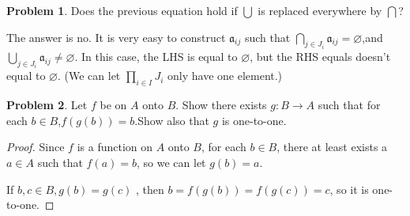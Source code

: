 \documentclass[a4paper,11pt]{article}%
\theoremstyle{remark}
\theoremstyle{definition}
\newtheorem{problem}{Problem}[subsection]
\begin{document}
\begin{problem}
    Does the previous equation hold if $\bigcup$ is replaced everywhere by $\bigcap$?

    The answer is no. It is very easy to construct $\mathfrak{a}_{ij}$ such that 
    $\bigcap_{j\in J_i}\mathfrak{a}_{ij}=\varnothing$,and $\bigcup_{j\in J_i}\mathfrak{a}_{ij}\neq\varnothing$.
    In this case, the LHS is equal to $\varnothing$, but the RHS equals doesn't equal to $\varnothing$.
    (We can let $\prod_{i\in I}J_i $ only have one element.)
\end{problem}
\begin{problem}
    Let $f$ be on $A$ onto $B$. Show there exists $g:B\rightarrow A$ such that for
    each $b\in B$,$f(g(b))=b$.Show also that $g$ is one-to-one.
    \begin{proof}
        Since $f$ is a function on $A$ onto $B$, for each $b\in B$, there at
        least exists a $a\in A$ such that $f(a)=b$, so we can let $g(b)=a$.

        If $b,c\in B , g(b)=g(c)$ , then $b=f(g(b))=f(g(c))=c$, so it is one-to-one.
    \end{proof}
\end{problem}
\end{document}
